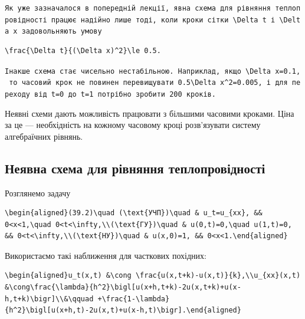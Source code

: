 \documentclass[
  ukrainian,
]{article}
\begin{document}
\texttt{Як\ уже\ зазначалося\ в\ попередній\ лекції,\ явна\ схема\ для\ рівняння\ теплопровідності\ працює\ надійно\ лише\ тоді,\ коли\ кроки\ сітки\ \textquotesingle{}\textbackslash{}Delta\ t\textquotesingle{}\ і\ \textquotesingle{}\textbackslash{}Delta\ x\textquotesingle{}\ задовольняють\ умову}

\begin{verbatim}
\frac{\Delta t}{(\Delta x)^2}\le 0.5.
\end{verbatim}

\texttt{Інакше\ схема\ стає\ чисельно\ нестабільною.\ Наприклад,\ якщо\ \textquotesingle{}\textbackslash{}Delta\ x=0.1\textquotesingle{},\ то\ часовий\ крок\ не\ повинен\ перевищувати\ \textquotesingle{}0.5\textbackslash{}Delta\ x\^{}2=0.005\textquotesingle{},\ і\ для\ переходу\ від\ \textquotesingle{}t=0\textquotesingle{}\ до\ \textquotesingle{}t=1\textquotesingle{}\ потрібно\ зробити\ 200\ кроків.}

Неявні схеми дають можливість працювати з більшими часовими кроками.
Ціна за це --- необхідність на кожному часовому кроці розв'язувати
систему алгебраїчних рівнянь.

\subsection{Неявна схема для рівняння
теплопровідності}\label{ux43dux435ux44fux432ux43dux430-ux441ux445ux435ux43cux430-ux434ux43bux44f-ux440ux456ux432ux43dux44fux43dux43dux44f-ux442ux435ux43fux43bux43eux43fux440ux43eux432ux456ux434ux43dux43eux441ux442ux456}

Розглянемо задачу

\begin{verbatim}
\begin{aligned}(39.2)\quad (\text{УЧП})\quad & u_t=u_{xx}, && 0<x<1,\quad 0<t<\infty,\\(\text{ГУ})\quad & u(0,t)=0,\quad u(1,t)=0, && 0<t<\infty,\\(\text{НУ})\quad & u(x,0)=1, && 0<x<1.\end{aligned}
\end{verbatim}

Використаємо такі наближення для часткових похідних:

\begin{verbatim}
\begin{aligned}u_t(x,t) &\cong \frac{u(x,t+k)-u(x,t)}{k},\\u_{xx}(x,t) &\cong\frac{\lambda}{h^2}\bigl[u(x+h,t+k)-2u(x,t+k)+u(x-h,t+k)\bigr]\\&\qquad +\frac{1-\lambda}{h^2}\bigl[u(x+h,t)-2u(x,t)+u(x-h,t)\bigr].\end{aligned}
\end{verbatim}
\end{document}
